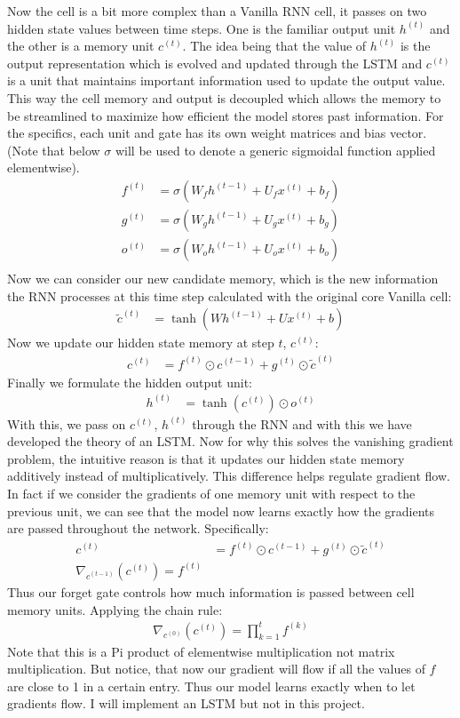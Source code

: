 \documentclass[12pt]{article}
\begin{document}
Now the cell is a bit more complex than a Vanilla RNN cell, it passes on two hidden state values between time steps.
One is the familiar output unit $h^{(t)}$ and the other is a memory unit $c^{(t)}$. The idea being
that the value of $h^{(t)}$ is the output representation which is evolved and updated through the LSTM and
$c^{(t)}$ is a unit that maintains important information used to update the output value. This way the cell
memory and output is decoupled which allows the memory to be streamlined to maximize how efficient the model
stores past information. For the specifics, each unit and gate has its own weight matrices and bias vector. (Note
that below $\sigma$ will be used to denote a generic sigmoidal function applied elementwise).
\begin{align*}
    f^{(t)} &= \sigma(W_fh^{(t-1)} + U_fx^{(t)} + b_f) \\
    g^{(t)} &= \sigma(W_gh^{(t-1)} + U_gx^{(t)} + b_g) \\
    o^{(t)} &=\sigma(W_oh^{(t-1)} + U_ox^{(t)} + b_o) \\
\end{align*}
Now we can consider our new candidate memory, which is the new information the RNN processes at this time
step calculated with the original core Vanilla cell:
\begin{align*}
    \tilde{c}^{(t)} &=  \tanh(Wh^{(t-1)} + Ux^{(t)} + b)
\end{align*}
Now we update our hidden state memory at step $t$, $c^{(t)}$:
\begin{align*}
    c^{(t)} &= f^{(t)} \odot c^{(t-1)} + g^{(t)} \odot \tilde{c}^{(t)}
\end{align*}
Finally we formulate the hidden output unit:
\begin{align*}
    h^{(t)} &= \tanh(c^{(t)}) \odot o^{(t)}
\end{align*}
With this, we pass on $c^{(t)}$, $h^{(t)}$ through the RNN and with this we have developed the theory of an LSTM.
Now for why this solves the vanishing gradient problem, the intuitive reason is that it updates our hidden state
memory additively instead of multiplicatively. This difference helps regulate gradient flow. In fact if we consider
the gradients of one memory unit with respect to the previous unit, we can see that the model now learns
exactly how the gradients are passed throughout the network. Specifically:
\begin{align*}
    c^{(t)} &= f^{(t)} \odot c^{(t-1)} + g^{(t)} \odot \tilde{c}^{(t)} \\
    \nabla_{c^{(t-1)}}(c^{(t)}) = f^{(t)}
\end{align*}
Thus our forget gate controls how much information is passed between cell memory units. Applying the chain rule:
\begin{align*}
     \nabla_{c^{(0)}}(c^{(t)}) = \prod_{k=1}^{t}f^{(k)}
\end{align*}
Note that this is a Pi product of elementwise multiplication not matrix multiplication. But notice, that
now our gradient will flow if all the values of $f$ are close to 1 in a certain entry. Thus our model learns
exactly when to let gradients flow. I will implement an LSTM but not in this project.
\end{document}
